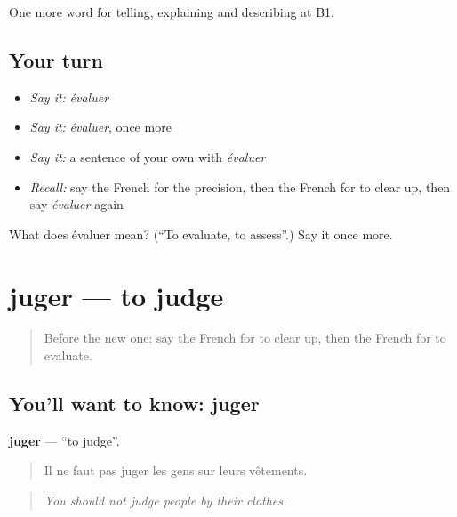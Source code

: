 \begin{grammarlens}[title={What you've built}]
One more word for telling, explaining and describing at B1.
\end{grammarlens}

\subsection*{Your turn}
\begin{itemize}
\raggedright
  \item \emph{Say it:} \emph{évaluer}
  \item \emph{Say it:} \emph{évaluer}, once more
  \item \emph{Say it:} a sentence of your own with \emph{évaluer}
  \item \emph{Recall:} say the French for the precision, then the French for to clear up, then say \emph{évaluer} again
\end{itemize}

\begin{tcolorbox}[breakable,colback=teal!4,colframe=teal!35!black,title={Before you move on}]
What does évaluer mean? (\textquotedblleft{}To evaluate, to assess\textquotedblright{}.) Say it once more.
\end{tcolorbox}
\section[juger]{juger — to judge}

\label{lesson:FR-C342-juger}



\begin{quote}
Before the new one: say the French for to clear up, then the French for to evaluate.
\end{quote}

\subsection*{You'll want to know: juger}
\textbf{juger} — \textquotedblleft{}to judge\textquotedblright{}.

\begin{quote}
Il ne faut pas juger les gens sur leurs vêtements.
\end{quote}

\begin{quote}
\emph{You should not judge people by their clothes.}
\end{quote}


